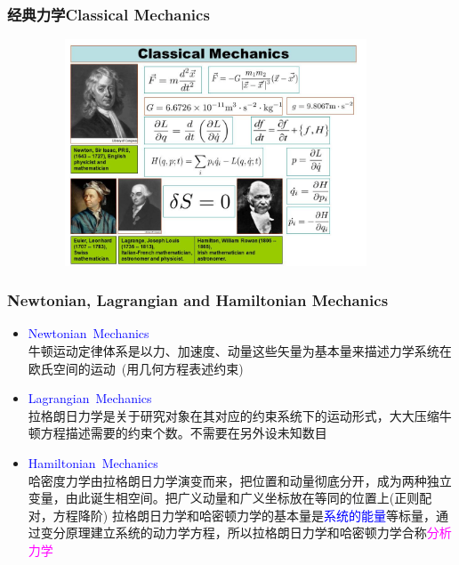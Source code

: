 {{\begin{figure}[h!]
\label{Philp_Nature}
\end{figure}
}

\frame
{
	\frametitle{经典力学\textrm{Classical Mechanics}}
\begin{figure}[h!]
\vspace*{-0.18in}
\centering
\includegraphics[height=2.65in,width=4.05in,viewport=0 0 715 495,clip]{Figures/Classical_Mechanics.jpg}
\label{Classical_Mechanics}
\end{figure}
}

\frame
{
	\frametitle{\textrm{\small Newtonian, Lagrangian and Hamiltonian Mechanics}}
	\begin{itemize}
   		\setlength{\itemsep}{10pt}
		\item \textrm{\textcolor{blue}{Newtonian~Mechanics}}\\
		牛顿运动定律体系是以力、加速度、动量这些矢量为基本量来描述力学系统在欧氏空间的运动~(用几何方程表述约束)
	\item \textrm{\textcolor{blue}{Lagrangian~Mechanics}}\\
		拉格朗日力学是关于研究对象在其对应的约束系统下的运动形式，大大压缩牛顿方程描述需要的约束个数。不需要在另外设未知数目
	\item \textrm{\textcolor{blue}{Hamiltonian~Mechanics}}\\
		哈密度力学由拉格朗日力学演变而来，把位置和动量彻底分开，成为两种独立变量，由此诞生相空间。把广义动量和广义坐标放在等同的位置上(正则配对，方程降阶)
		\vskip 6pt
		拉格朗日力学和哈密顿力学的基本量是\textcolor{blue}{系统的能量}等标量，通过变分原理建立系统的动力学方程，所以拉格朗日力学和哈密顿力学合称\textcolor{magenta}{分析力学}
	\end{itemize}
}

}
